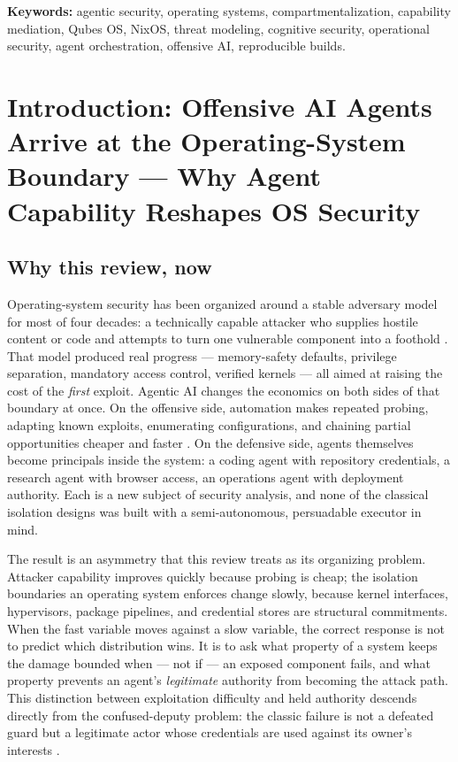 \documentclass[
  english,
  9pt,
]{extarticle}
\newcounter{none} %
\begin{document}
\textbf{Keywords:} agentic security, operating systems,
compartmentalization, capability mediation, Qubes OS, NixOS, threat
modeling, cognitive security, operational security, agent orchestration,
offensive AI, reproducible builds.

\newpage

\section{Introduction: Offensive AI Agents Arrive at the
Operating-System Boundary --- Why Agent Capability Reshapes OS
Security}\label{sec:introduction}

\subsection{Why this review, now}\label{why-this-review-now}

Operating-system security has been organized around a stable adversary
model for most of four decades: a technically capable attacker who
supplies hostile content or code and attempts to turn one vulnerable
component into a foothold \citep{saltzer1975, lampson1974}. That model
produced real progress --- memory-safety defaults, privilege separation,
mandatory access control, verified kernels \citep{klein2009} --- all
aimed at raising the cost of the \emph{first} exploit. Agentic AI
changes the economics on both sides of that boundary at once. On the
offensive side, automation makes repeated probing, adapting known
exploits, enumerating configurations, and chaining partial opportunities
cheaper and faster \citep{ncsc_ai_cyber_threat}. On the defensive side,
agents themselves become principals inside the system: a coding agent
with repository credentials, a research agent with browser access, an
operations agent with deployment authority. Each is a new subject of
security analysis, and none of the classical isolation designs was built
with a semi-autonomous, persuadable executor in mind.

The result is an asymmetry that this review treats as its organizing
problem. Attacker capability improves quickly because probing is cheap;
the isolation boundaries an operating system enforces change slowly,
because kernel interfaces, hypervisors, package pipelines, and
credential stores are structural commitments. When the fast variable
moves against a slow variable, the correct response is not to predict
which distribution wins. It is to ask what property of a system keeps
the damage bounded when --- not if --- an exposed component fails, and
what property prevents an agent's \emph{legitimate} authority from
becoming the attack path. This distinction between exploitation
difficulty and held authority descends directly from the confused-deputy
problem: the classic failure is not a defeated guard but a legitimate
actor whose credentials are used against its owner's interests
\citep{hardy1988, levy1984}.
\end{document}
